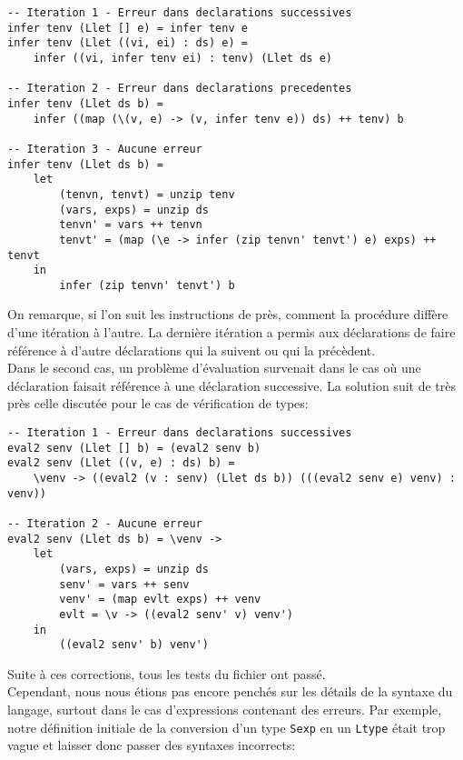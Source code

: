 \documentclass[10pt, titlepage]{article}
\begin{document}
\begin{lstlisting}
-- Iteration 1 - Erreur dans declarations successives
infer tenv (Llet [] e) = infer tenv e
infer tenv (Llet ((vi, ei) : ds) e) =
    infer ((vi, infer tenv ei) : tenv) (Llet ds e)

-- Iteration 2 - Erreur dans declarations precedentes
infer tenv (Llet ds b) =
    infer ((map (\(v, e) -> (v, infer tenv e)) ds) ++ tenv) b

-- Iteration 3 - Aucune erreur
infer tenv (Llet ds b) =
    let
        (tenvn, tenvt) = unzip tenv
        (vars, exps) = unzip ds
        tenvn' = vars ++ tenvn
        tenvt' = (map (\e -> infer (zip tenvn' tenvt') e) exps) ++ tenvt
    in
        infer (zip tenvn' tenvt') b
\end{lstlisting}
On remarque, si l'on suit les instructions de près, comment la procédure
diffère d'une itération à l'autre. La dernière itération a permis aux
déclarations de faire référence à d'autre déclarations qui la suivent ou qui la
précèdent.\\

Dans le second cas, un problème d'évaluation survenait dans le cas où une
déclaration faisait référence à une déclaration successive. La solution suit de
très près celle discutée pour le cas de vérification de types:

\begin{lstlisting}
-- Iteration 1 - Erreur dans declarations successives
eval2 senv (Llet [] b) = (eval2 senv b)
eval2 senv (Llet ((v, e) : ds) b) =
    \venv -> ((eval2 (v : senv) (Llet ds b)) (((eval2 senv e) venv) : venv))

-- Iteration 2 - Aucune erreur
eval2 senv (Llet ds b) = \venv ->
    let
        (vars, exps) = unzip ds
        senv' = vars ++ senv
        venv' = (map evlt exps) ++ venv
        evlt = \v -> ((eval2 senv' v) venv')
    in
        ((eval2 senv' b) venv')
\end{lstlisting}
Suite à ces corrections, tous les tests du fichier ont passé. \\

Cependant, nous nous étions pas encore penchés sur les détails de la syntaxe du
langage, surtout dans le cas d'expressions contenant des erreurs. Par exemple,
notre définition initiale de la conversion d'un type \texttt{Sexp} en un
\texttt{Ltype} était trop vague et laisser donc passer des syntaxes incorrects:
\end{document}
